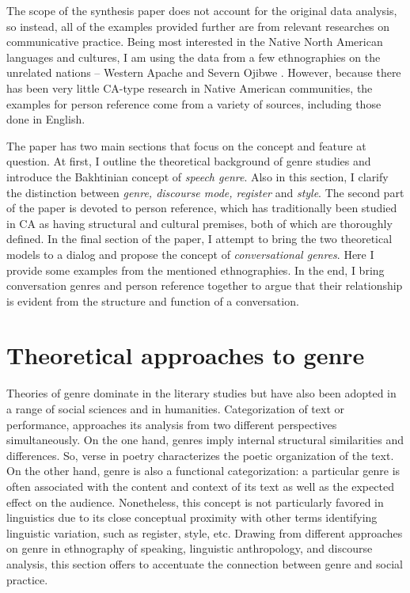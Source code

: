 \documentclass[12pt]{article}
\begin{document}
The scope of the synthesis paper does not account for the original data analysis, so instead, all of the examples provided further are from relevant researches on communicative practice. Being most interested in the Native North American languages and cultures, I am using the data from a few ethnographies on the unrelated nations -- Western Apache \parencite{basso1996, basso1990, samuels2004} and Severn Ojibwe \parencite{valentine1995}. However, because there has been very little CA-type research in Native American communities, the examples for person reference come from a variety of sources, including those done in English. 

The paper has two main sections that focus on the concept and feature at question. At first, I  outline the theoretical background of genre studies and introduce the Bakhtinian concept of \textit{speech genre}. Also in this section, I  clarify the distinction between \textit{genre, discourse mode, register} and \textit{style}. The second part of the paper is devoted to person reference, which has traditionally been studied in CA as having structural and cultural premises, both of which are thoroughly defined. In the final section of the paper, I attempt to bring the two theoretical models to a dialog and propose the concept of \textit{conversational genres}. Here I provide some examples from the mentioned ethnographies. In the end, I bring conversation genres and person reference together to argue that their relationship is evident from the structure and function of a conversation.
\section{Theoretical approaches to genre}
Theories of genre dominate in the literary studies but have also been adopted in a range of social sciences and in humanities. Categorization of text or performance, approaches its analysis from two different perspectives simultaneously. On the one hand, genres imply internal structural similarities and differences. So, verse in poetry characterizes the poetic organization of the text. On the other hand, genre is also a functional categorization: a particular genre is often associated with the content and context of its text as well as the expected effect on the audience. Nonetheless, this concept is not particularly favored in linguistics due to its close conceptual proximity with other terms identifying linguistic variation, such as register, style, etc. Drawing from different approaches on genre in ethnography of speaking, linguistic anthropology, and discourse analysis, this section offers to accentuate the connection between genre and social practice.
\end{document}
